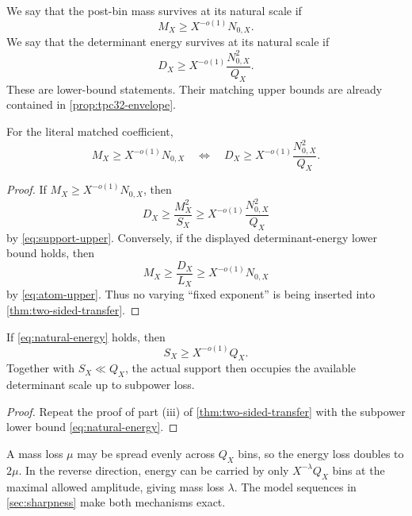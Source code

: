 \begin{definition}
\label{def:subpower-survival}
We say that the post-bin mass survives at its natural scale if
\begin{equation}
 M_X\ge X^{-o(1)}N_{0,X}.
\label{eq:natural-mass}
\end{equation}
We say that the determinant energy survives at its natural scale if
\begin{equation}
 D_X\ge
 X^{-o(1)}\frac{N_{0,X}^2}{Q_X}.
\label{eq:natural-energy}
\end{equation}
These are lower-bound statements.  Their matching upper bounds are
already contained in \cref{prop:tpc32-envelope}.
\end{definition}

\begin{corollary}
\label{cor:subpower-equivalence}
For the literal matched coefficient,
\begin{equation}
\boxed{
 M_X\ge X^{-o(1)}N_{0,X}
 \quad\Longleftrightarrow\quad
 D_X\ge
 X^{-o(1)}\frac{N_{0,X}^2}{Q_X}.}
\label{eq:subpower-equivalence}
\end{equation}
\end{corollary}

\begin{proof}
If \(M_X\ge X^{-o(1)}N_{0,X}\), then
\[
 D_X\ge\frac{M_X^2}{S_X}
 \ge X^{-o(1)}\frac{N_{0,X}^2}{Q_X}
\]
by \eqref{eq:support-upper}.  Conversely, if the displayed
determinant-energy lower bound holds, then
\[
 M_X\ge\frac{D_X}{L_X}
 \ge X^{-o(1)}N_{0,X}
\]
by \eqref{eq:atom-upper}.  Thus no varying ``fixed exponent'' is
being inserted into \cref{thm:two-sided-transfer}.
\end{proof}

\begin{corollary}
\label{cor:support-forced}
If \eqref{eq:natural-energy} holds, then
\[
 S_X\ge X^{-o(1)}Q_X.
\]
Together with \(S_X\ll Q_X\), the actual support then occupies the
available determinant scale up to subpower loss.
\end{corollary}

\begin{proof}
Repeat the proof of part (iii) of
\cref{thm:two-sided-transfer} with the subpower lower bound
\eqref{eq:natural-energy}.
\end{proof}

\begin{remark}
A mass loss \(\mu\) may be spread evenly across \(Q_X\) bins, so the
energy loss doubles to \(2\mu\).  In the reverse direction, energy
can be carried by only \(X^{-\lambda}Q_X\) bins at the maximal
allowed amplitude, giving mass loss \(\lambda\).  The model sequences
in \cref{sec:sharpness} make both mechanisms exact.
\end{remark}
